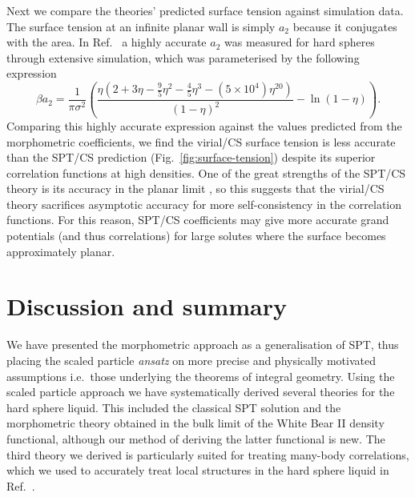 \documentclass[11pt,twoside]{report}
\begin{document}
Next we compare the theories' predicted surface tension against simulation data.
The surface tension at an infinite planar wall is simply $a_2$ because it conjugates with the area.
In Ref.\ \cite{DavidchackMP2015} a highly accurate $a_2$ was measured for hard spheres through extensive simulation, which was parameterised by the following expression
\begin{equation}\label{eq:quasi-exact-surface-tension}
  \beta a_2
  =
  \frac{1}{\pi \sigma^2} \left(
  \frac{\eta (2 + 3\eta - \frac{9}{5}\eta^2 - \frac{4}{5}\eta^3 - (5 \times 10^4) \eta^{20})}{(1 - \eta)^2}
  - \ln{(1 - \eta)}
  \right).
\end{equation}
Comparing this highly accurate expression against the values predicted from the morphometric coefficients, we find the virial/CS surface tension is less accurate than the SPT/CS prediction (Fig.\ \ref{fig:surface-tension}) despite its superior correlation functions at high densities.
One of the great strengths of the SPT/CS theory is its accuracy in the planar limit \cite{Hansen-GoosJPCM2006}, so this suggests that the virial/CS theory sacrifices asymptotic accuracy for more self-consistency in the correlation functions.
For this reason, SPT/CS coefficients may give more accurate grand potentials (and thus correlations) for large solutes where the surface becomes approximately planar.

\section{Discussion and summary}

We have presented the morphometric approach as a generalisation of SPT, thus placing the scaled particle \emph{ansatz} on more precise and physically motivated assumptions i.e.\ those underlying the theorems of integral geometry.
Using the scaled particle approach we have systematically derived several theories for the hard sphere liquid.
This included the classical SPT solution and the morphometric theory obtained in the bulk limit of the White Bear II density functional, although our method of deriving the latter functional is new.
The third theory we derived is particularly suited for treating many-body correlations, which we used to accurately treat local structures in the hard sphere liquid in Ref.\ \cite{RobinsonPRL2019}.
\end{document}
